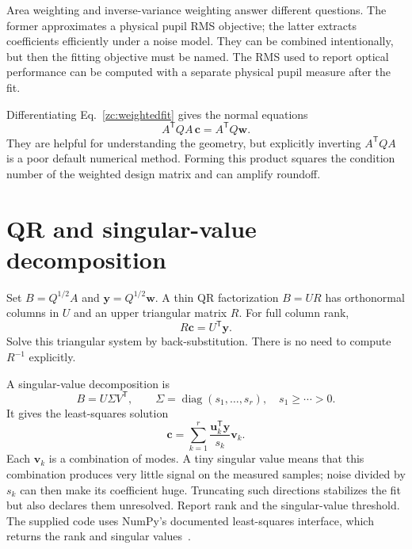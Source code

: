 Area weighting and inverse-variance weighting answer different
questions. The former approximates a physical pupil RMS objective;
the latter extracts coefficients efficiently under a noise model.
They can be combined intentionally, but then the fitting objective
must be named. The RMS used to report optical performance can be
computed with a separate physical pupil measure after the fit.

Differentiating Eq.~\eqref{zc:weightedfit} gives the normal equations
\begin{equation}
 A^{\mathsf T}QA\,\bm c=A^{\mathsf T}Q\bm w.
 \label{zc:normalequations}
\end{equation}
They are helpful for understanding the geometry, but explicitly
inverting $A^{\mathsf T}QA$ is a poor default numerical method.
Forming this product squares the condition number of the weighted
design matrix and can amplify roundoff.

\section{QR and singular-value decomposition}
Set $B=Q^{1/2}A$ and $\bm y=Q^{1/2}\bm w$. A thin QR factorization
$B=UR$ has orthonormal columns in $U$ and an upper triangular matrix
$R$. For full column rank,
\begin{equation}
 R\bm c=U^{\mathsf T}\bm y.
\end{equation}
Solve this triangular system by back-substitution. There is no need
to compute $R^{-1}$ explicitly.

A singular-value decomposition is
\begin{equation}
 B=U\Sigma V^{\mathsf T},\qquad
 \Sigma=\operatorname{diag}(s_1,\ldots,s_r),\quad s_1\geq\cdots>0.
\end{equation}
It gives the least-squares solution
\begin{equation}
 \bm c=\sum_{k=1}^r
          \frac{\bm u_k^{\mathsf T}\bm y}{s_k}\bm v_k.
\end{equation}
Each $\bm v_k$ is a combination of modes. A tiny singular value means
that this combination produces very little signal on the measured
samples; noise divided by $s_k$ can then make its coefficient huge.
Truncating such directions stabilizes the fit but also declares them
unresolved. Report rank and the singular-value threshold.
The supplied code uses NumPy's documented least-squares interface,
which returns the rank and singular values~\cite{zc:numpylstsq}.

